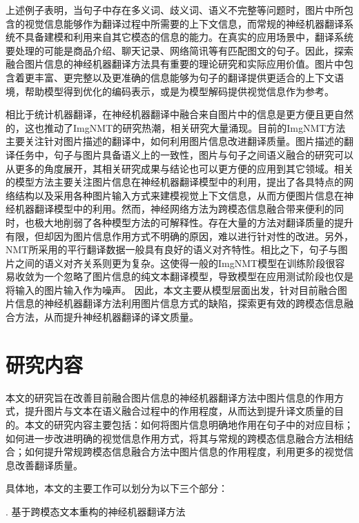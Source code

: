 上述例子表明，当句子中存在多义词、歧义词、语义不完整等问题时，图片中所包含的视觉信息能够作为翻译过程中所需要的上下文信息，而常规的神经机器翻译系统不具备建模和利用来自其它模态的信息的能力。在真实的应用场景中，翻译系统要处理的可能是商品介绍、聊天记录、网络简讯等有匹配图文的句子。因此，探索融合图片信息的神经机器翻译方法具有重要的理论研究和实际应用价值。图片中包含着更丰富、更完整以及更准确的信息能够为句子的翻译提供更适合的上下文语境，帮助模型得到优化的编码表示，或是为模型解码提供视觉信息作为参考。

相比于统计机器翻译，在神经机器翻译中融合来自图片中的信息是更方便且更自然的，这也推动了ImgNMT的研究热潮，相关研究大量涌现。目前的ImgNMT方法主要关注针对图片描述的翻译中，如何利用图片信息改进翻译质量。图片描述的翻译任务中，句子与图片具备语义上的一致性，图片与句子之间语义融合的研究可以从更多的角度展开，其相关研究成果与结论也可以更方便的应用到其它领域。相关的模型方法主要关注图片信息在神经机器翻译模型中的利用，提出了各具特点的网络结构以及采用各种图片输入方式来建模视觉上下文信息，从而方便图片信息在神经机器翻译模型中的利用。然而，神经网络方法为跨模态信息融合带来便利的同时，也极大地削弱了各种模型方法的可解释性。存在大量的方法对翻译质量的提升有限，但却因为图片信息作用方式不明确的原因，难以进行针对性的改进。另外，NMT所采用的平行翻译数据一般具有良好的语义对齐特性。相比之下，句子与图片之间的语义对齐关系则更为复杂。这使得一般的ImgNMT模型在训练阶段很容易收敛为一个忽略了图片信息的纯文本翻译模型，导致模型在应用测试阶段也仅是将输入的图片输入作为噪声。
因此，本文主要从模型层面出发，针对目前融合图片信息的神经机器翻译方法利用图片信息方式的缺陷，探索更有效的跨模态信息融合方法，从而提升神经机器翻译的译文质量。


\section{研究内容}

本文的研究旨在改善目前融合图片信息的神经机器翻译方法中图片信息的作用方式，提升图片与文本在语义融合过程中的作用程度，从而达到提升译文质量的目的。本文的研究内容主要包括：如何将图片信息明确地作用在句子中的对应目标；如何进一步改进明确的视觉信息作用方式，将其与常规的跨模态信息融合方法相结合；如何提升常规跨模态信息融合方法中图片信息的作用程度，利用更多的视觉信息改善翻译质量。

具体地，本文的主要工作可以划分为以下三个部分：

{. 基于跨模态文本重构的神经机器翻译方法}


